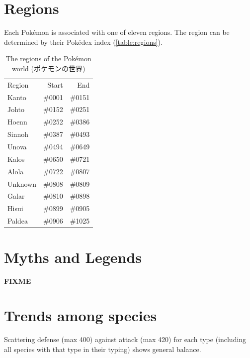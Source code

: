 \section{Regions}
\label{sec:regions}
Each Pokémon is associated with one of eleven regions.
The region can be determined by their Pokédex index (\autoref{table:regions}).
\begin{table}[ht]
  \begin{center}
    \begin{tabular}{lrr}
      Region & Start & End\\
      \Midrule
      Kanto & \#0001 & \#0151\\
      Johto & \#0152 & \#0251\\
      Hoenn & \#0252 & \#0386\\
      Sinnoh & \#0387 & \#0493\\
      Unova & \#0494 & \#0649\\
      Kalos & \#0650 & \#0721\\
      Alola & \#0722 & \#0807\\
      Unknown & \#0808 & \#0809\\
      Galar & \#0810 & \#0898\\
      Hisui & \#0899 & \#0905\\
      Paldea & \#0906 & \#1025\\
    \end{tabular}
  \end{center}
  \caption{The regions of the Pokémon world (\textjapanese{ポケモンの世界})}
  \label{table:regions}
\end{table}

\section{Myths and Legends}
\label{sec:myths}
\textbf{FIXME}

\section{Trends among species}


Scattering defense (max 400) against attack (max 420) for each type
(including all species with that type in their typing) shows general
balance.

